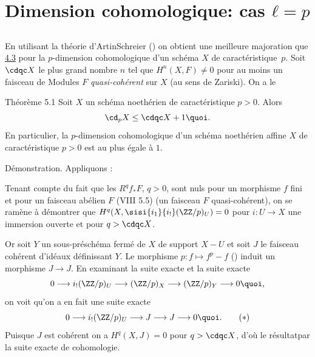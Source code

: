 \documentclass[10pt]{../fichiers-configuration-latex/smfart}
\begin{document}
\section{Dimension cohomologique: cas $ℓ=p$}\pageoriginale 

\setcounter{subsection}{-1}
\subsection{}
En utilisant la théorie d'Artin\sisi{ - }{-}Schreier () on obtient une
meilleure majoration que \hyperref[X.cor4.3]{4.3} pour la $p$-dimension
cohomologique d'un 
schéma $X$ de caractéristique $p$. Soit $\cdqc X$ le plus grand nombre
$n$ tel que $H^n(X,F)\neq 0$ pour au moins un faisceau de Modules $F$
\emph{quasi-cohérent} sur $X$ (au sens de Zariski). On a le

\begin{enonce*}{Théorème 5.1}
Soit $X$ un schéma noethérien de caractéristique $p>0$. Alors
$$
\cd_pX\leq \cdqc X+1{\quoi}.
$$
En particulier, la $p$-dimension cohomologique d'un schéma noethérien
affine $X$ de caractéristique $p>0$ est au plus égale à $1$.
\end{enonce*}

Démonstration. Appliquons :

Tenant compte du fait que les $R^q f_{\ast}F$, $q>0$, sont nuls pour un
morphisme $f$ fini et pour un faisceau abélien $F$ (VIII 5.5) %
(\resp un faisceau $F$ quasi-cohérent), on se ramène à démontrer que
$H^q(X,\sisi{i_1}{i_!}(\ZZ/p)_U)=0$ pour $i:U\rightarrow X$ une
immersion ouverte et pour $q>\cdqc X$.

Or soit $Y$ un sous-préschéma fermé de $X$ de support $X-U$ et soit
$J$ le faisceau cohérent d'idéaux définissant $Y$. Le morphisme
$p:f\mapsto f^p-f$ () induit un morphisme $J\rightarrow J$. En
examinant la suite exacte  et la suite exacte
$$
0\longrightarrow i_{!}(\ZZ/p)_U\longrightarrow
(\ZZ/p)_X\longrightarrow
(\ZZ/p)_Y\longrightarrow 0{\quoi},
$$
on voit qu'on a en fait une suite exacte
\begin{equation*}
0\longrightarrow i_{!}(\ZZ/p)_U\longrightarrow
J\longrightarrow J\longrightarrow 0{\quoi}.\tag{$\ast$}
\end{equation*}
Puisque $J$ est cohérent on a $H^q(X,J)=0$ pour $q>\cdqc X$, d'où le
résultat\pageoriginale par la suite exacte de cohomologie.
\end{document}
